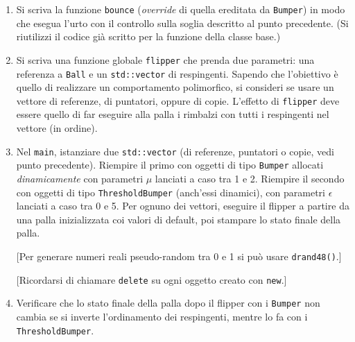 \documentclass[12pt,italian]{article}
\begin{document}
\begin{enumerate}
\item
Si scriva la funzione {\tt bounce} (\emph{override} di quella ereditata da {\tt Bumper}) in modo che esegua
l'urto con il controllo sulla soglia descritto al punto precedente.
(Si riutilizzi il codice gi\`a scritto per la funzione della classe base.)

\item
Si scriva una funzione globale {\tt flipper} che prenda due parametri:
una referenza a {\tt Ball}
e un {\tt std::vector} di respingenti.
Sapendo che l'obiettivo \`e quello di realizzare un comportamento polimorfico,
si consideri se usare un vettore di referenze, di puntatori, oppure di copie.
L'effetto di {\tt flipper} deve essere quello di far eseguire alla palla
i rimbalzi con tutti i respingenti nel vettore (in ordine).

\item
Nel {\tt main}, istanziare due {\tt std::vector}
(di referenze, puntatori o copie, vedi punto precedente).
Riempire il primo con oggetti di tipo {\tt Bumper} allocati \emph{dinamicamente}
con parametri $\mu$ lanciati a caso tra 1 e 2.
Riempire il secondo con oggetti di tipo {\tt ThresholdBumper} (anch'essi dinamici),
con parametri $\epsilon$ lanciati a caso tra 0 e 5.
Per ognuno dei vettori, eseguire il flipper a partire da una palla
inizializzata coi valori di default,
poi stampare lo stato finale della palla.

[Per generare numeri reali pseudo-random tra 0 e 1 si pu\`o usare {\tt drand48()}.]

[Ricordarsi di chiamare {\tt delete} su ogni oggetto creato con {\tt new}.]

\item
Verificare che lo stato finale della palla dopo il flipper con i {\tt Bumper}
non cambia se si inverte l'ordinamento dei respingenti, mentre lo fa
con i {\tt ThresholdBumper}.




\end{enumerate}
\end{document}
